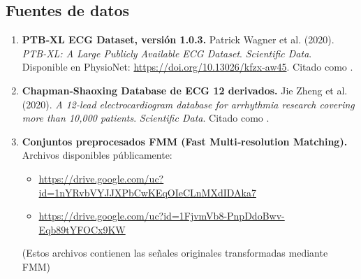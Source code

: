 \documentclass[11pt]{article}
\begin{document}
\subsection*{Fuentes de datos}

\begin{enumerate}
  \item \textbf{PTB‑XL ECG Dataset, versión 1.0.3.}  
    Patrick Wagner et al. (2020). \emph{PTB-XL: A Large Publicly Available ECG Dataset}. \emph{Scientific Data}. Disponible en PhysioNet: \url{https://doi.org/10.13026/kfzx-aw45}. Citado como \cite{wagner2020ptb}.

  \item \textbf{Chapman‑Shaoxing Database de ECG 12 derivados.}  
    Jie Zheng et al. (2020). \emph{A 12-lead electrocardiogram database for arrhythmia research covering more than 10,000 patients}. \emph{Scientific Data}. Citado como \cite{zheng2020chapman}.

  \item \textbf{Conjuntos preprocesados FMM (Fast Multi‑resolution Matching).}  
    Archivos disponibles públicamente:  
    \begin{itemize}
      \item \url{https://drive.google.com/uc?id=1nYRvbVYJJXPbCwKEqOIeCLnMXdIDAka7}
      \item \url{https://drive.google.com/uc?id=1FjvmVb8-PnpDdoBwv-Eqb89tYFOCx9KW}
    \end{itemize}
    (Estos archivos contienen las señales originales transformadas mediante FMM)
\end{enumerate}



\end{document}
